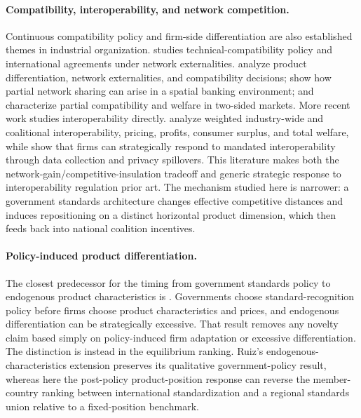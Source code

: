 \paragraph{Compatibility, interoperability, and network competition.}
Continuous compatibility policy and firm-side differentiation are also established themes in industrial organization. \citet{Klimenko2009} studies technical-compatibility policy and international agreements under network externalities. \citet{BaakeBoom2001} analyze product differentiation, network externalities, and compatibility decisions; \citet{MatutesPadilla1994} show how partial network sharing can arise in a spatial banking environment; and \citet{DingKoShen2022} characterize partial compatibility and welfare in two-sided markets. More recent work studies interoperability directly. \citet{HuangEtAl2026} analyze weighted industry-wide and coalitional interoperability, pricing, profits, consumer surplus, and total welfare, while \citet{KretschmerEtAl2025} show that firms can strategically respond to mandated interoperability through data collection and privacy spillovers. This literature makes both the network-gain/competitive-insulation tradeoff and generic strategic response to interoperability regulation prior art. The mechanism studied here is narrower: a government standards architecture changes effective competitive distances and induces repositioning on a distinct horizontal product dimension, which then feeds back into national coalition incentives.

\paragraph{Policy-induced product differentiation.}
The closest predecessor for the timing from government standards policy to endogenous product characteristics is \citet{Ruiz2004}. Governments choose standard-recognition policy before firms choose product characteristics and prices, and endogenous differentiation can be strategically excessive. That result removes any novelty claim based simply on policy-induced firm adaptation or excessive differentiation. The distinction is instead in the equilibrium ranking. Ruiz's endogenous-characteristics extension preserves its qualitative government-policy result, whereas here the post-policy product-position response can reverse the member-country ranking between international standardization and a regional standards union relative to a fixed-position benchmark.


